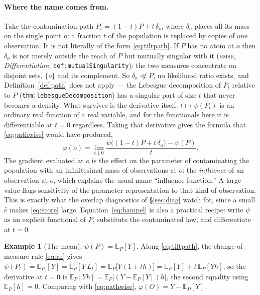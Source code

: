 \documentclass[11pt,a4paper]{article}
\theoremstyle{plain}
\theoremstyle{definition}
\newtheorem{example}[theorem]{Example}
\theoremstyle{remark}
\newcommand{\E}{\mathbb E}
\newcommand{\code}[1]{\texttt{\small #1}}
\newcommand{\probrepo}{\textsc{bmse}}
\begin{document}
\paragraph{Where the name comes from.}
Take the contamination path $P_t=(1-t)P+t\,\delta_o$, where $\delta_o$ places all its mass on
the single point $o$: a fraction $t$ of the population is replaced by copies of one observation.
It is not literally of the form \eqref{eq:tiltpath}. If $P$ has no atom at $o$ then $\delta_o$ is
not merely outside the reach of $P$ but mutually singular with it (\probrepo{},
\emph{Differentiation}, \code{def:mutualSingularity}): the two measures concentrate on disjoint
sets, $\{o\}$ and its complement. So $\delta_o\not\ll P$, no likelihood ratio exists, and
Definition~\ref{def:path} does not apply --- the Lebesgue decomposition of $P_t$ relative to $P$
(\code{thm:lebesgueDecomposition}) has a singular part of size $t$ that never becomes a density.
What survives is the derivative itself: $t\mapsto\psi(P_t)$ is an ordinary real function of a
real variable, and for the functionals here it is differentiable at $t=0$ regardless. Taking that
derivative gives the formula that \eqref{eq:pathwise} would have produced,
\begin{equation}
\varphi(o)=\lim_{t\downarrow0}\frac{\psi\bigl((1-t)P+t\,\delta_o\bigr)-\psi(P)}{t}.
\label{eq:hampel}
\end{equation}
The gradient evaluated at $o$ is the effect on the parameter of contaminating the population with
an infinitesimal mass of observations at $o$: the \emph{influence} of an observation at $o$,
which explains the usual name ``influence function.'' A large value flags sensitivity of the
parameter representation to that kind of observation. This is exactly what the overlap
diagnostics of \S\ref{sec:diag} watch for, since a small $\hat e$ makes \eqref{eq:score} large.
Equation~\eqref{eq:hampel} is also a practical recipe: write $\psi$ as an explicit functional of
$P$, substitute the contaminated law, and differentiate at $t=0$.

\begin{example}[The mean]\label{ex:if-mean}
$\psi(P)=\E_P[Y]$. Along \eqref{eq:tiltpath}, the change-of-measure rule \eqref{eq:rn} gives
$\psi(P_t)=\E_{P_t}[Y]=\E_P[Y\,L_t]=\E_P\bigl[Y(1+th)\bigr]=\E_P[Y]+t\,\E_P[Yh]$,
so the derivative at $t=0$ is
$\E_P[Yh]=\E_P\bigl[(Y-\E_P[Y])h\bigr]$, the second equality using $\E_P[h]=0$. Comparing with
\eqref{eq:pathwise}, $\varphi(O)=Y-\E_P[Y]$.
\end{example}
\end{document}
